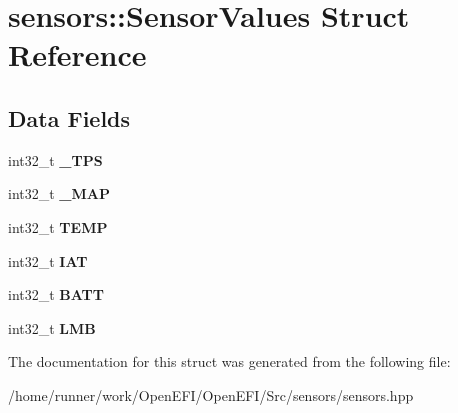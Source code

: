 \hypertarget{structsensors_1_1SensorValues}{}\section{sensors\+:\+:Sensor\+Values Struct Reference}
\label{structsensors_1_1SensorValues}
\subsection*{Data Fields}
\begin{DoxyCompactItemize}
\item 
\mbox{\label{structsensors_1_1SensorValues_ad703c7668dbb6f22511e5105b66ce4e9}} 
int32\+\_\+t {\bfseries \+\_\+\+T\+PS}
\item 
\mbox{\label{structsensors_1_1SensorValues_aa6f5597bd720cd46d9fa61a0b3740301}} 
int32\+\_\+t {\bfseries \+\_\+\+M\+AP}
\item 
\mbox{\label{structsensors_1_1SensorValues_a49dca08974dfea5b6cc2e1ea873f76df}} 
int32\+\_\+t {\bfseries T\+E\+MP}
\item 
\mbox{\label{structsensors_1_1SensorValues_a3c7eebe30720d9989a4e3f987b632308}} 
int32\+\_\+t {\bfseries I\+AT}
\item 
\mbox{\label{structsensors_1_1SensorValues_a2fefa7192bca2313ac9b3c6c228d74e3}} 
int32\+\_\+t {\bfseries B\+A\+TT}
\item 
\mbox{\label{structsensors_1_1SensorValues_aaa52eeb58e41dbc312ad3bcf19fbc7b8}} 
int32\+\_\+t {\bfseries L\+MB}
\end{DoxyCompactItemize}


The documentation for this struct was generated from the following file\+:\begin{DoxyCompactItemize}
\item 
/home/runner/work/\+Open\+E\+F\+I/\+Open\+E\+F\+I/\+Src/sensors/sensors.\+hpp\end{DoxyCompactItemize}
